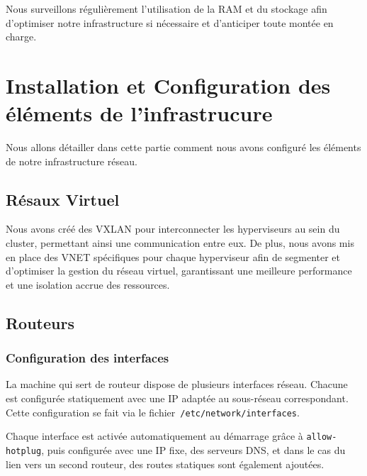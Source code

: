 \documentclass{article}
\begin{document}
Nous surveillons régulièrement l’utilisation de la RAM et du stockage afin d’optimiser notre infrastructure si nécessaire et d’anticiper toute montée en charge.

\section{Installation et Configuration des éléments de l'infrastrucure}
Nous allons détailler dans cette partie comment nous avons configuré les éléments de notre infrastructure réseau.
\subsection{Résaux Virtuel}

Nous avons créé des VXLAN pour interconnecter les hyperviseurs au sein du cluster, permettant ainsi une communication entre eux. De plus, nous avons mis en place des VNET spécifiques pour chaque hyperviseur afin de segmenter et d’optimiser la gestion du réseau virtuel, garantissant une meilleure performance et une isolation accrue des ressources.

\subsection{Routeurs}
\subsubsection{Configuration des interfaces}

La machine qui sert de routeur dispose de plusieurs interfaces réseau. Chacune est configurée statiquement avec une IP adaptée au sous-réseau correspondant. Cette configuration se fait via le fichier~\texttt{/etc/network/interfaces}.

Chaque interface est activée automatiquement au démarrage grâce à \texttt{allow-hotplug}, puis configurée avec une IP fixe, des serveurs DNS, et dans le cas du lien vers un second routeur, des routes statiques sont également ajoutées.
\end{document}
